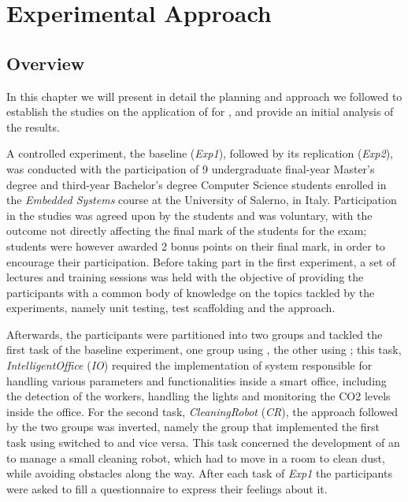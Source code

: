 \chapter{Experimental Approach}
\label{chap:5_approach}
\section{Overview}
In this chapter we will present in detail the planning and approach we followed to establish the studies on the application of \tdd for \ess, and provide an initial analysis of the results.

A controlled experiment, the baseline (\textit{Exp1}), followed by its replication (\textit{Exp2}), was conducted with the participation of 9 undergraduate final-year Master's degree and third-year Bachelor's degree Computer Science students enrolled in the \textit{Embedded Systems} course at the University of Salerno, in Italy. Participation in the studies was agreed upon by the students and was voluntary, with the outcome not directly affecting the final mark of the students for the exam; students were however awarded 2 bonus points on their final mark, in order to encourage their participation.
Before taking part in the first experiment, a set of lectures and training sessions was held with the objective of providing the participants with a common body of knowledge on the topics tackled by the experiments, namely unit testing, test scaffolding and the \tdd approach.

Afterwards, the participants were partitioned into two groups and tackled the first task of the baseline experiment, one group using \tdd, the other using \notdd; this task, \textit{IntelligentOffice} (\textit{IO}) required the implementation of system responsible for handling various parameters and functionalities inside a smart office, including the detection of the workers, handling the lights and monitoring the CO2 levels inside the office.
For the second task, \textit{CleaningRobot} (\textit{CR}), the approach followed by the two groups was inverted, namely the group that implemented the first task using \tdd switched to \notdd and vice versa. This task concerned the development of an \es to manage a small cleaning robot, which had to move in a room to clean dust, while avoiding obstacles along the way.
After each task of \textit{Exp1} the participants were asked to fill a questionnaire to express their feelings about it.

